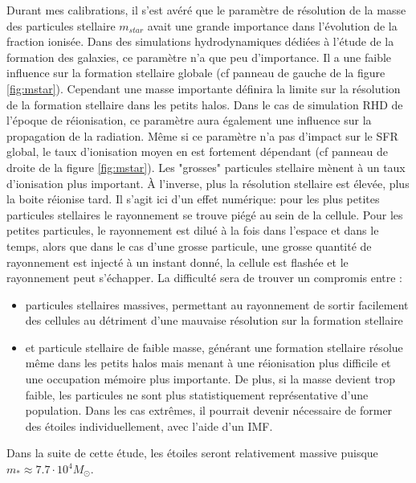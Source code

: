 Durant mes calibrations, il s'est avéré que le paramètre de résolution de la masse des particules stellaire $m_{star}$ avait une grande importance dans l'évolution de la fraction ionisée.
Dans des simulations hydrodynamiques dédiées à l'étude de la formation des galaxies, ce paramètre n'a que peu d'importance.
Il a une faible influence sur la formation stellaire globale (cf panneau de gauche de la figure \ref{fig:mstar}).
Cependant une masse importante  définira la limite sur la résolution de la formation stellaire dans les petits halos.
Dans le cas de simulation \ac{RHD} de l'époque de réionisation, ce paramètre aura également une influence sur la propagation de la radiation.
Même si ce paramètre n'a pas d'impact sur le \ac{SFR} global, le taux d'ionisation moyen en est fortement dépendant (cf panneau de droite de la figure \ref{fig:mstar}).
Les "grosses" particules stellaire mènent à un taux d'ionisation plus important.
À l'inverse, plus la résolution stellaire est élevée, plus la boite réionise tard.
Il s'agit ici d'un effet numérique: pour les plus petites particules stellaires le rayonnement se trouve piégé au sein de la cellule.
Pour les petites particules, le rayonnement est dilué à la fois dans l'espace et dans le temps, alors que dans le cas d'une grosse particule, une grosse quantité de rayonnement est injecté à un instant donné, la cellule est flashée et le rayonnement peut s'échapper.
La difficulté sera de trouver un compromis entre :

\begin{itemize}
\item particules stellaires massives, permettant au rayonnement de sortir facilement des cellules au détriment d'une mauvaise résolution sur la formation stellaire
\item  et particule stellaire de faible masse, générant une formation stellaire résolue même dans les petits halos mais menant à une réionisation plus difficile et une occupation mémoire plus importante.
De plus, si la masse devient trop faible, les particules ne sont plus statistiquement représentative d'une population.
Dans les cas extrêmes, il pourrait devenir nécessaire de former des étoiles individuellement, avec l'aide d'un \ac{IMF}.
\end{itemize}

Dans la suite de cette étude, les étoiles seront relativement massive puisque $m_* \approx 7.7 \cdot 10^4 M_\odot$.


